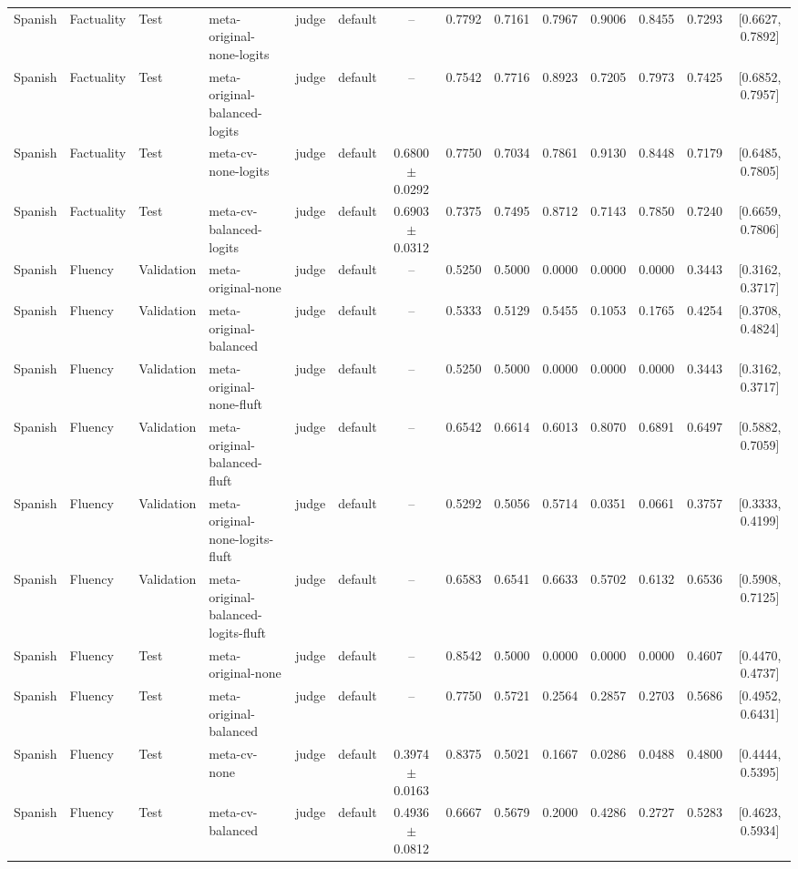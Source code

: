 \begin{tabular}{llllllcccccccc}
Spanish & Factuality & Test & meta-original-none-logits & judge & default & -- & 0.7792 & 0.7161 & 0.7967 & 0.9006 & 0.8455 & 0.7293 & [0.6627, 0.7892] \\
Spanish & Factuality & Test & meta-original-balanced-logits & judge & default & -- & 0.7542 & 0.7716 & 0.8923 & 0.7205 & 0.7973 & 0.7425 & [0.6852, 0.7957] \\
Spanish & Factuality & Test & meta-cv-none-logits & judge & default & 0.6800 $\pm$ 0.0292 & 0.7750 & 0.7034 & 0.7861 & 0.9130 & 0.8448 & 0.7179 & [0.6485, 0.7805] \\
Spanish & Factuality & Test & meta-cv-balanced-logits & judge & default & 0.6903 $\pm$ 0.0312 & 0.7375 & 0.7495 & 0.8712 & 0.7143 & 0.7850 & 0.7240 & [0.6659, 0.7806] \\
Spanish & Fluency & Validation & meta-original-none & judge & default & -- & 0.5250 & 0.5000 & 0.0000 & 0.0000 & 0.0000 & 0.3443 & [0.3162, 0.3717] \\
Spanish & Fluency & Validation & meta-original-balanced & judge & default & -- & 0.5333 & 0.5129 & 0.5455 & 0.1053 & 0.1765 & 0.4254 & [0.3708, 0.4824] \\
Spanish & Fluency & Validation & meta-original-none-fluft & judge & default & -- & 0.5250 & 0.5000 & 0.0000 & 0.0000 & 0.0000 & 0.3443 & [0.3162, 0.3717] \\
Spanish & Fluency & Validation & meta-original-balanced-fluft & judge & default & -- & 0.6542 & 0.6614 & 0.6013 & 0.8070 & 0.6891 & 0.6497 & [0.5882, 0.7059] \\
Spanish & Fluency & Validation & meta-original-none-logits-fluft & judge & default & -- & 0.5292 & 0.5056 & 0.5714 & 0.0351 & 0.0661 & 0.3757 & [0.3333, 0.4199] \\
Spanish & Fluency & Validation & meta-original-balanced-logits-fluft & judge & default & -- & 0.6583 & 0.6541 & 0.6633 & 0.5702 & 0.6132 & 0.6536 & [0.5908, 0.7125] \\
Spanish & Fluency & Test & meta-original-none & judge & default & -- & 0.8542 & 0.5000 & 0.0000 & 0.0000 & 0.0000 & 0.4607 & [0.4470, 0.4737] \\
Spanish & Fluency & Test & meta-original-balanced & judge & default & -- & 0.7750 & 0.5721 & 0.2564 & 0.2857 & 0.2703 & 0.5686 & [0.4952, 0.6431] \\
Spanish & Fluency & Test & meta-cv-none & judge & default & 0.3974 $\pm$ 0.0163 & 0.8375 & 0.5021 & 0.1667 & 0.0286 & 0.0488 & 0.4800 & [0.4444, 0.5395] \\
Spanish & Fluency & Test & meta-cv-balanced & judge & default & 0.4936 $\pm$ 0.0812 & 0.6667 & 0.5679 & 0.2000 & 0.4286 & 0.2727 & 0.5283 & [0.4623, 0.5934] \\

\end{tabular}
